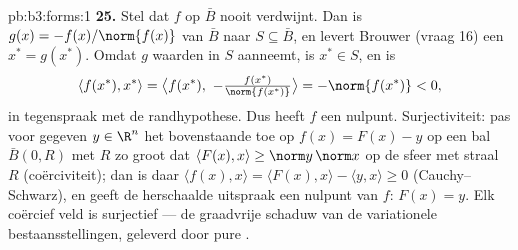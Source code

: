 \begin{solution}{pb:b3:forms:1}
\textbf{25.} Stel dat $f$ op $\bar B$ nooit verdwijnt. Dan is
$g(x) = -f(x)/\norm{f(x)}$  van $\bar B$ naar $S \subseteq
\bar B$, en levert Brouwer (vraag 16) een $x^* = g(x^*)$. Omdat
$g$ waarden in $S$ aanneemt, is $x^* \in S$, en is
\[
\langle f(x^*), x^*\rangle = \bigl\langle f(x^*),\
-\tfrac{f(x^*)}{\norm{f(x^*)}}\bigr\rangle
= -\norm{f(x^*)} < 0,
\]
in tegenspraak met de randhypothese. Dus heeft $f$ een nulpunt.
Surjectiviteit: pas voor gegeven $y \in \R^n$ het bovenstaande
toe op $f(x) = F(x) - y$ op een bal $\bar B(0, R)$ met $R$ zo
groot dat $\langle F(x), x\rangle \geq \norm y\,\norm x$ op de
sfeer met straal $R$ (coërciviteit); dan is daar $\langle f(x),
x\rangle = \langle F(x), x\rangle - \langle y, x\rangle \geq 0$
(Cauchy--Schwarz), en geeft de herschaalde uitspraak een nulpunt
van $f$: $F(x) = y$. Elk coërcief  veld is surjectief ---
de graadvrije schaduw van de variationele bestaansstellingen,
geleverd door pure .
\end{solution}
